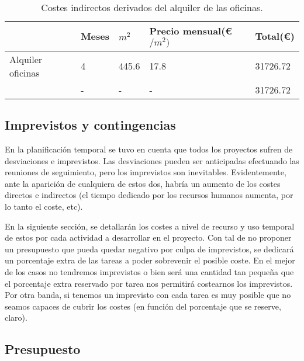 \begin{table}[H]
\begin{tabular}{l|l|l|l|l|}
\cline{2-5}
                                                    & Meses   & $m^{2}$ & Precio mensual(\euro$/m^{2})$ & Total(\euro) \\ \hline
\multicolumn{1}{|l|}{Alquiler oficinas }            & 4  & 445.6   & 17.8 & 31726.72     \\ \hline
\rowcolor{gray!50}
\multicolumn{1}{|l|}{Total} & - &   -       &  -              &   31726.72       \\ \hline
\end{tabular}
\caption{Costes indirectos derivados del alquiler de las oficinas.}
\end{table}

\subsection{Imprevistos y contingencias}

En la planificación temporal se tuvo en cuenta que todos los proyectos sufren de desviaciones e imprevistos. Las desviaciones pueden ser anticipadas efectuando las reuniones de seguimiento, pero los imprevistos son inevitables. Evidentemente, ante la aparición de cualquiera de estos dos, habría un aumento de los costes directos e indirectos (el tiempo dedicado por los recursos humanos aumenta, por lo tanto el coste, etc).
\par\medskip
En la siguiente sección, se detallarán los costes a nivel de recurso y uso temporal de estos por cada actividad a desarrollar en el proyecto. Con tal de no proponer un presupuesto que pueda quedar negativo por culpa de imprevistos, se dedicará un porcentaje extra de las tareas a poder sobrevenir el posible coste.
En el mejor de los casos no tendremos imprevistos o bien será una cantidad tan pequeña que el porcentaje extra reservado por tarea nos permitirá costearnos los imprevistos. Por otra banda, si tenemos un imprevisto con cada tarea es muy posible que no seamos capaces de cubrir los costes (en función del porcentaje que se reserve, claro).

\subsection{Presupuesto}


